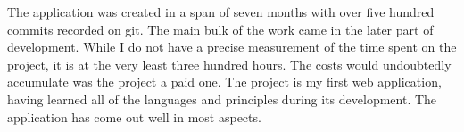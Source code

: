 \documentclass[
  digital,     %
  oneside,     %
  nosansbold,  %
  colorbold, %
  lof,         %
  lot,         %
]{fithesis4}
\begin{document}
The application was created in a span of seven months with over five hundred commits recorded on git. The main bulk of the work came in the later part of development. While I do not have a precise measurement of the time spent on the project, it is at the very least three hundred hours. The costs would undoubtedly accumulate was the project a paid one. The project is my first web application, having learned all of the languages and principles during its development. The application has come out well in most aspects.

\printbibliography[heading=bibintoc] %


\end{document}
